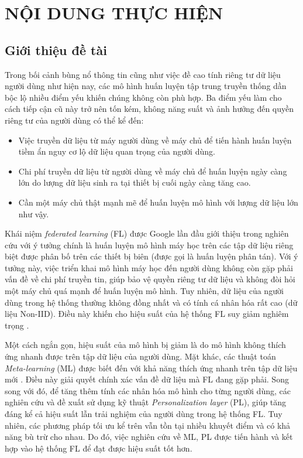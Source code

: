 \documentclass{article}[14pt]
\begin{document}
    \section{NỘI DUNG THỰC HIỆN}
    {

    \subsection{Giới thiệu đề tài}

    Trong bối cảnh bùng nổ thông tin cũng như việc đề cao tính riêng tư dữ liệu người dùng như hiện nay, các mô hình huấn luyện tập trung truyền thống dần bộc lộ nhiều điểm yếu khiến chúng không còn phù hợp. Ba điểm yếu làm cho cách tiếp cận cũ này trở nên tốn kém, không năng suất và ảnh hưởng đến quyền riêng tư của người dùng có thể kể đến:

    \begin{itemize}
        \item Việc truyền dữ liệu từ máy người dùng về máy chủ để tiến hành huấn luyện tiềm ẩn nguy cơ lộ dữ liệu quan trọng của người dùng.
        \item Chi phí truyền dữ liệu từ người dùng về máy chủ để huấn luyện ngày càng lớn do lượng dữ liệu sinh ra tại thiết bị cuối ngày càng tăng cao.
        \item Cần một máy chủ thật mạnh mẽ để huấn luyện mô hình với lượng dữ liệu lớn như vậy.
    \end{itemize}

    Khái niệm \textit{federated learning} (FL) được Google lần đầu giới thiệu trong nghiên cứu \cite{mcmahan2017communication} với ý tưởng chính là huấn luyện mô hình máy học trên các tập dữ liệu riêng biệt được phân bố trên các thiết bị biên (được gọi là huấn luyện phân tán). Với ý tưởng này, việc triển khai mô hình máy học đến người dùng không còn gặp phải vấn đề về chi phí truyền tin, giúp bảo vệ quyền riêng tư dữ liệu và không đòi hỏi một máy chủ quá mạnh để huấn luyện mô hình. Tuy nhiên, dữ liệu của người dùng trong hệ thống thường không đồng nhất và có tính cá nhân hóa rất cao (dữ liệu Non-IID). Điều này khiến cho hiệu suất của hệ thống FL suy giảm nghiêm trọng \cite{zhao2018federated}.

    Một cách ngắn gọn, hiệu suất của mô hình bị giảm là do mô hình không thích ứng nhanh được trên tập dữ liệu của người dùng. Mặt khác, các thuật toán \textit{Meta-learning} (ML) được biết đến với khả năng thích ứng nhanh trên tập dữ liệu mới \cite{hospedales2020meta}. Điều này giải quyết chính xác vấn đề dữ liệu mà FL đang gặp phải. Song song với đó, để tăng thêm tính các nhân hóa mô hình cho từng người dùng, các nghiên cứu \cite{hospedales2020meta} và \cite{arivazhagan2019federated} đề xuất sử dụng kỹ thuật \textit{Personalization layer} (PL), giúp tăng đáng kể cả hiệu suất lẫn trải nghiệm của người dùng trong hệ thống FL. Tuy nhiên, các phương pháp tối ưu kể trên vẫn tồn tại nhiều khuyết điểm và có khả năng bù trừ cho nhau. Do đó, việc nghiên cứu về ML, PL được tiến hành và kết hợp vào hệ thống FL để đạt được hiệu suất tốt hơn.

}
\end{document}
